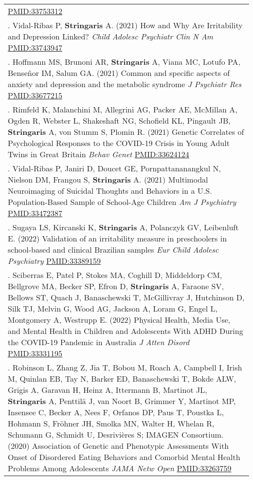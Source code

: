 \documentclass[
]{article}
\begin{document}
\begin{longtable}[]{@{}
  >{\raggedright\arraybackslash}p{}@{}}
{Cogn Neurosci Neuroimaging} \url{PMID:33753312} \\
53. Vidal-Ribas P, \textbf{Stringaris} A. (2021) How and Why Are
Irritability and Depression Linked? \emph{Child Adolesc Psychiatr Clin N
Am} \url{PMID:33743947} \\
54. Hoffmann MS, Brunoni AR, \textbf{Stringaris} A, Viana MC, Lotufo PA,
Benseñor IM, Salum GA. (2021) Common and specific aspects of anxiety and
depression and the metabolic syndrome \emph{J Psychiatr Res}
\url{PMID:33677215} \\
55. Rimfeld K, Malanchini M, Allegrini AG, Packer AE, McMillan A, Ogden
R, Webster L, Shakeshaft NG, Schofield KL, Pingault JB,
\textbf{Stringaris} A, von Stumm S, Plomin R. (2021) Genetic Correlates
of Psychological Responses to the COVID-19 Crisis in Young Adult Twins
in Great Britain \emph{Behav Genet} \url{PMID:33624124} \\
56. Vidal-Ribas P, Janiri D, Doucet GE, Pornpattananangkul N, Nielson
DM, Frangou S, \textbf{Stringaris} A. (2021) Multimodal Neuroimaging of
Suicidal Thoughts and Behaviors in a U.S. Population-Based Sample of
School-Age Children \emph{Am J Psychiatry} \url{PMID:33472387} \\
57. Sugaya LS, Kircanski K, \textbf{Stringaris} A, Polanczyk GV,
Leibenluft E. (2022) Validation of an irritability measure in
preschoolers in school-based and clinical Brazilian samples \emph{Eur
Child Adolesc Psychiatry} \url{PMID:33389159} \\
58. Sciberras E, Patel P, Stokes MA, Coghill D, Middeldorp CM, Bellgrove
MA, Becker SP, Efron D, \textbf{Stringaris} A, Faraone SV, Bellows ST,
Quach J, Banaschewski T, McGillivray J, Hutchinson D, Silk TJ, Melvin G,
Wood AG, Jackson A, Loram G, Engel L, Montgomery A, Westrupp E. (2022)
Physical Health, Media Use, and Mental Health in Children and
Adolescents With ADHD During the COVID-19 Pandemic in Australia \emph{J
Atten Disord} \url{PMID:33331195} \\
59. Robinson L, Zhang Z, Jia T, Bobou M, Roach A, Campbell I, Irish M,
Quinlan EB, Tay N, Barker ED, Banaschewski T, Bokde ALW, Grigis A,
Garavan H, Heinz A, Ittermann B, Martinot JL, \textbf{Stringaris} A,
Penttilä J, van Noort B, Grimmer Y, Martinot MP, Insensee C, Becker A,
Nees F, Orfanos DP, Paus T, Poustka L, Hohmann S, Fröhner JH, Smolka MN,
Walter H, Whelan R, Schumann G, Schmidt U, Desrivières S; IMAGEN
Consortium. (2020) Association of Genetic and Phenotypic Assessments
With Onset of Disordered Eating Behaviors and Comorbid Mental Health
Problems Among Adolescents \emph{JAMA Netw Open} \url{PMID:33263759} \\

\end{longtable}
\end{document}
